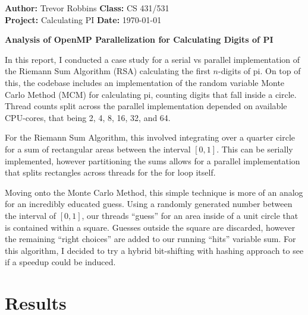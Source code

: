 \documentclass[11pt,a4paper]{article}
\begin{document}
\noindent
\textbf{Author:} Trevor Robbins \hfill \textbf{Class:} CS 431/531 \\
\textbf{Project:} Calculating PI \hfill \textbf{Date:} \today

\vspace{1.5em}

\begin{center}
    {\LARGE \textbf{Analysis of OpenMP Parallelization for Calculating Digits of PI}}
\end{center}

\vspace{1em}

In this report, I conducted a case study for a serial vs parallel implementation of the Riemann Sum Algorithm (RSA) calculating the first $n$-digits of pi. On top of this, the codebase includes an implementation of the random variable Monte Carlo Method (MCM) for calculating pi, counting digits that fall inside a circle. Thread counts split across the parallel implementation depended on available CPU-cores, that being 2, 4, 8, 16, 32, and 64.

\vspace{0.75em}

For the Riemann Sum Algorithm, this involved integrating over a quarter circle for a sum of rectangular areas between the interval $[0, 1]$. This can be serially implemented, however partitioning the sums allows for a parallel implementation that splits rectangles across threads for the for loop itself.

\vspace{0.75em}

Moving onto the Monte Carlo Method, this simple technique is more of an analog for an incredibly educated guess. Using a randomly generated number between the interval of $[0, 1]$, our threads ``guess'' for an area inside of a unit circle that is contained within a square. Guesses outside the square are discarded, however the remaining ``right choices'' are added to our running ``hits'' variable sum. For this algorithm, I decided to try a hybrid bit-shifting with hashing approach to see if a speedup could be induced.

\vspace{1.5em}

\section*{Results}
\end{document}
